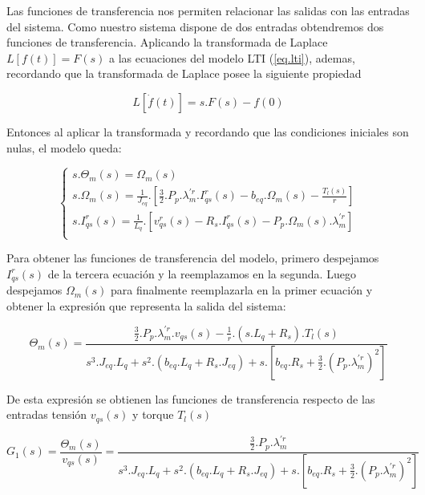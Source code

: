 \documentclass{article}
\begin{document}
Las funciones de transferencia nos permiten relacionar las salidas con las entradas del sistema.
Como nuestro sistema dispone de dos entradas obtendremos dos funciones de transferencia. Aplicando 
la transformada de Laplace $L[f(t)] = F(s)$ a las ecuaciones del modelo LTI (\ref{eq.lti}), ademas,
recordando que la transformada de Laplace posee la siguiente propiedad

\begin{equation}
        L[\dot{f}(t)] = s.F(s) - f(0)
\end{equation}

Entonces al aplicar la transformada y recordando que las condiciones iniciales son nulas, el 
modelo queda:

\begin{equation}
    \begin{cases}
        s.\Theta_{m}(s) = \Omega_{m}(s)\\
        s.\Omega_{m}(s) = \frac{1}{J_{eq}}.[\frac{3}{2}.P_{p}.\lambda_{m}^{\prime r}.I_{qs}^r(s) - b_{eq}.\Omega_m(s) - \frac{T_{l}(s)}{r}]\\
        s.I_{qs}^r(s) = \frac{1}{L_{q}}.[v_{qs}^r(s) - R_{s}.I_{qs}^r(s) - P_{p}.\Omega_{m}(s).\lambda_{m}^{\prime r}]\\
    \end{cases}
\end{equation}

Para obtener las funciones de transferencia del modelo, primero despejamos $I_{qs}^r(s)$
de la tercera ecuación y la reemplazamos en la segunda. Luego despejamos $\Omega_m(s)$ para 
finalmente reemplazarla en la primer ecuación y obtener la expresión que representa la salida del sistema: 

\begin{equation}
    \Theta_{m}(s) = \frac{\frac{3}{2}.P_{p}.\lambda_{m}^{\prime r}.v_{qs}(s) - \frac{1}{r}.(s.L_{q}+R_{s}).T_{l}(s)}{s^3.J_{eq}.L_{q} + s^2.(b_{eq}.L_{q} +  R_{s}.J_{eq}) + s.[b_{eq}.R_{s}+\frac{3}{2}.(P_{p}.\lambda_{m}^{\prime r})^2]}
\end{equation}

De esta expresión se obtienen las funciones de transferencia respecto de las entradas tensión $v_{qs}(s)$ y torque $T_{l}(s)$

\begin{equation}\label{eq.trasnferencia_1}
    G_{1}(s) = \frac{\Theta_{m}(s)}{v_{qs}(s)} = \frac{\frac{3}{2}.P_{p}.\lambda_{m}^{\prime r}}{s^3.J_{eq}.L_{q} + s^2.(b_{eq}.L_{q} +  R_{s}.J_{eq}) + s.[b_{eq}.R_{s}+\frac{3}{2}.(P_{p}.\lambda_{m}^{\prime r})^2]}
\end{equation}
\end{document}
